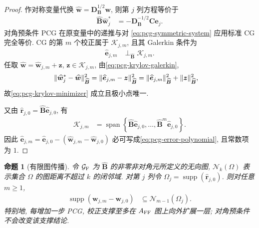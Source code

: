 \documentclass{ctexart}
\renewcommand{\ge}{\geqslant}
\DeclareMathOperator{\supp}{supp}
\DeclarePairedDelimiter\norm{\lVert}{\rVert}
\newtheorem{proposition}[theorem]{命题}
\begin{document}
\begin{proof}
作对称变量代换
$\widehat{\bm w}=\bm D_{\bm B}^{1/2}\bm w$,
则第 $j$ 列方程等价于
\begin{align}
    \widehat{\bm B}\widehat{\bm w}_j^\ast
    &=
    -\bm D_{\bm B}^{-1/2}\bm C\bm e_j.
    \label{eq:pcg-symmetric-system}
\end{align}
对角预条件 PCG 在原变量中的递推与对
\cref{eq:pcg-symmetric-system} 应用标准 CG 完全等价. CG 的第 $m$ 个校正属于
$\mathcal K_{j,m}$, 且其 Galerkin 条件为
\begin{align}
    \widehat{\bm e}_{j,m}
    &\perp_{\widehat{\bm B}}\mathcal K_{j,m}.
    \label{eq:pcg-krylov-galerkin}
\end{align}
任取
$\widehat{\bm w}=\widehat{\bm w}_{j,m}+\bm z$,
$\bm z\in\mathcal K_{j,m}$, 由\cref{eq:pcg-krylov-galerkin},
\begin{align}
    \norm{\widehat{\bm w}_j^\ast-\widehat{\bm w}}_{\widehat{\bm B}}^2
    &=
    \norm{\widehat{\bm e}_{j,m}-\bm z}_{\widehat{\bm B}}^2
     =
    \norm{\widehat{\bm e}_{j,m}}_{\widehat{\bm B}}^2
    +\norm{\bm z}_{\widehat{\bm B}}^2,
    \label{eq:pcg-krylov-minimizer-proof}
\end{align}
故\cref{eq:pcg-krylov-minimizer} 成立且极小点唯一.

又由
$\widehat{\bm r}_{j,0}
=\widehat{\bm B}\widehat{\bm e}_{j,0}$,
有
\begin{align}
    \mathcal K_{j,m}
    &=
    \operatorname{span}\left\{
      \widehat{\bm B}\widehat{\bm e}_{j,0},
      \ldots,
      \widehat{\bm B}^{m}\widehat{\bm e}_{j,0}
    \right\}.
    \label{eq:pcg-krylov-error-span}
\end{align}
因此
$\widehat{\bm e}_{j,m}
=\widehat{\bm e}_{j,0}-(\widehat{\bm w}_{j,m}-\widehat{\bm w}_{j,0})$
必可写成\cref{eq:pcg-error-polynomial}, 且常数项为 $1$.
\end{proof}

\begin{proposition}[有限图传播]
\label{prop:pcg-finite-propagation}
令 $\mathcal G_{\rm F}$ 为 $\widehat{\bm B}$ 的非零非对角元所定义的无向图,
$\mathcal N_k(\Omega)$ 表示集合 $\Omega$ 的图距离不超过 $k$ 的闭邻域. 对第 $j$ 列令
$\Omega_j=\supp(\widehat{\bm r}_{j,0})$. 则对任意 $m\ge1$,
\begin{align}
  \supp(\bm w_{j,m}-\bm w_{j,0})
  &\subseteq \mathcal N_{m-1}(\Omega_j).
  \label{eq:pcg-finite-propagation}
\end{align}
特别地, 每增加一步 PCG, 校正支撑至多在 $A_{\rm FF}$ 图上向外扩展一层; 对角预条件不会改变该支撑结论.
\end{proposition}
\end{document}
